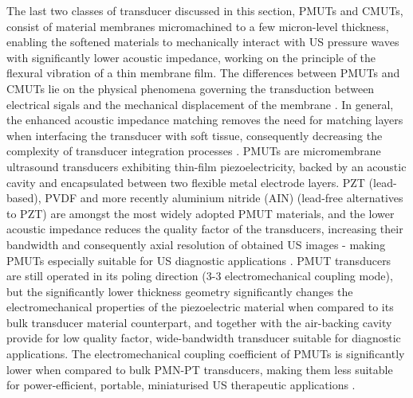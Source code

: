 The last two classes of transducer discussed in this section, PMUTs and CMUTs, consist of material 
membranes micromachined to a few micron-level thickness, enabling the softened materials 
to mechanically interact with US pressure waves with significantly lower acoustic impedance, 
working on the principle of the flexural vibration of a thin membrane film.
The differences between PMUTs and CMUTs lie on the physical phenomena governing the 
transduction between electrical sigals and the mechanical displacement of the 
membrane \cite{https://doi.org/10.1109/ACCESS.2024.3359906}.
In general, the enhanced acoustic impedance matching removes the need for matching layers when 
interfacing the transducer with soft tissue, consequently decreasing the complexity of transducer 
integration processes \cite{https://doi.org/10.1038/s41378-023-00555-7, https://doi.org/10.1109/TUFFC.2021.3112917}. 
PMUTs are micromembrane ultrasound transducers exhibiting thin-film piezoelectricity, 
backed by an acoustic cavity and encapsulated between two flexible metal electrode layers.
PZT (lead-based), PVDF and more recently aluminium nitride (AIN) (lead-free alternatives to PZT) are amongst the most widely 
adopted PMUT materials, and the lower acoustic impedance reduces the quality factor of the transducers, 
increasing their bandwidth and consequently axial resolution of obtained US images - making PMUTs especially 
suitable for US diagnostic applications \cite{https://doi.org/10.1109/ACCESS.2024.3359906, 10.1109/TRANSDUCERS.2019.8808774, 10.1109/ULTSYM.2019.8926015}.
PMUT transducers are still operated in its poling direction (3-3 electromechanical coupling mode), 
but the significantly lower thickness geometry significantly changes the electromechanical properties of the piezoelectric material 
when compared to its bulk transducer material counterpart, and together with the air-backing cavity 
provide for low quality factor, wide-bandwidth transducer suitable for diagnostic applications. 
The electromechanical coupling coefficient of PMUTs is significantly lower when compared to bulk 
PMN-PT transducers, making them less suitable for power-efficient, portable, 
miniaturised US therapeutic applications \cite{https://www.nature.com/articles/s41378-024-00783-5, https://doi.org/10.1038/s41378-023-00555-7}.

